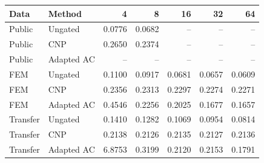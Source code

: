 \begin{tabular}{llrrrrr}
\toprule
Data & Method & 4 & 8 & 16 & 32 & 64 \\
\midrule
Public & Ungated & 0.0776 & 0.0682 & -- & -- & -- \\
Public & CNP & 0.2650 & 0.2374 & -- & -- & -- \\
Public & Adapted AC & -- & -- & -- & -- & -- \\
FEM & Ungated & 0.1100 & 0.0917 & 0.0681 & 0.0657 & 0.0609 \\
FEM & CNP & 0.2356 & 0.2313 & 0.2297 & 0.2274 & 0.2271 \\
FEM & Adapted AC & 0.4546 & 0.2256 & 0.2025 & 0.1677 & 0.1657 \\
Transfer & Ungated & 0.1410 & 0.1282 & 0.1069 & 0.0954 & 0.0814 \\
Transfer & CNP & 0.2138 & 0.2126 & 0.2135 & 0.2127 & 0.2136 \\
Transfer & Adapted AC & 6.8753 & 0.3199 & 0.2120 & 0.2153 & 0.1791 \\
\bottomrule
\end{tabular}
